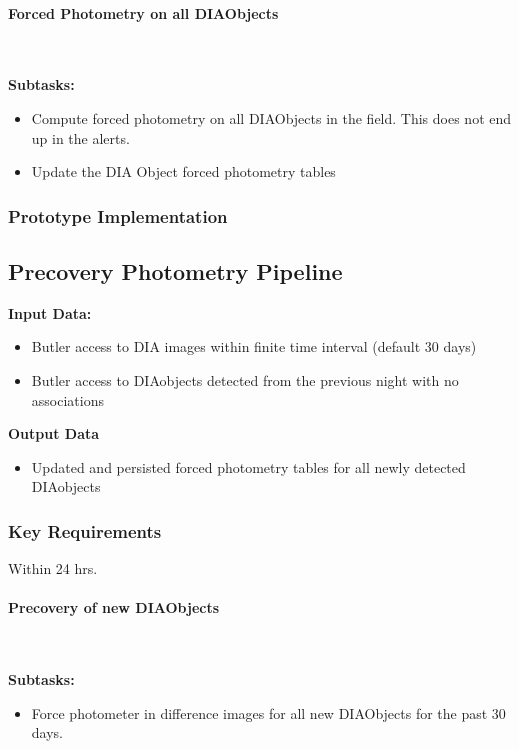 \paragraph{Forced Photometry on all DIAObjects}~

\noindent
{\bf Subtasks:}
\begin{itemize}
\item Compute forced photometry on all DIAObjects in the field.  This
  does not end up in the alerts.
\item Update the DIA Object forced photometry tables
\end{itemize}

\subsubsection{Prototype Implementation}

\clearpage

\subsection{Precovery Photometry Pipeline}

\noindent
{\bf Input Data:}\\
\begin{itemize}
\item Butler access to DIA images within finite time interval (default 
  30 days) 
\item Butler access to DIAobjects detected from the previous night 
  with no associations 
\end{itemize}
{\bf Output Data}\\
\begin{itemize}
\item Updated and persisted forced photometry tables for all newly
  detected DIAobjects
\end{itemize}

\subsubsection{Key Requirements}

Within 24 hrs.

\paragraph{Precovery of new DIAObjects}~

\noindent
{\bf Subtasks:}
\begin{itemize}
\item Force photometer in difference images for all new DIAObjects for the past 30 days.
\end{itemize}
\clearpage


